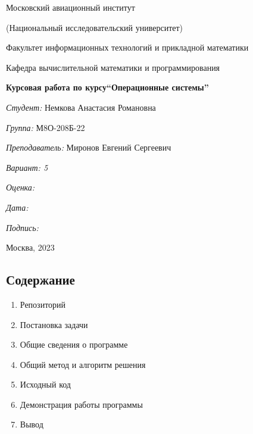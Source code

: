 \documentclass[a4paper, 14pt]{article}
\begin{document}
\thispagestyle{empty}	
\begin{center}
	Московский авиационный институт
	
	(Национальный исследовательский университет)
	
	Факультет информационных технологий и прикладной математики
	
	Кафедра вычислительной математики и программирования
	
\end{center}
\vspace{40ex}
\begin{center}
	\textbf{\large{Курсовая работа по курсу\linebreak \textquotedblleft Операционные системы\textquotedblright}}
\end{center}
\vspace{35ex}
\begin{flushright}
	\textit{Студент: } Немкова Анастасия Романовна
	
	\vspace{2ex}
	\textit{Группа: } М8О-208Б-22
	
	\vspace{2ex}
	\textit{Преподаватель: } Миронов Евгений Сергеевич
	
	\vspace{2ex}
	\textit{Вариант: 5} 
	
	\vspace{2ex}
	\textit{Оценка: } \underline{\quad\quad\quad\quad\quad\quad}
	
	 \vspace{2ex}
	\textit{Дата: } \underline{\quad\quad\quad\quad\quad\quad}
	
	\vspace{2ex}
	\textit{Подпись: } \underline{\quad\quad\quad\quad\quad\quad}
	
\end{flushright}

\vspace{5ex}

\begin{vfill}
	\begin{center}
		Москва, 2023
	\end{center}	
\end{vfill}
\newpage

\begin{center}
\section*{Содержание}   
\end{center}
\vspace{5ex}
\begin{enumerate}
  \item Репозиторий
  \item Постановка задачи
  \item Общие сведения о программе
  \item Общий метод и алгоритм решения
  \item Исходный код
  \item Демонстрация работы программы
  \item Вывод
\end{enumerate}
\newpage
\end{document}
